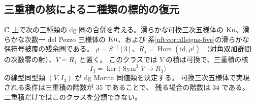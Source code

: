 \subsection{三重積の核による二種類の標的の復元}
\label{nft:sec:triple-kernel}
\begin{theorem}\label{nft:thm:triple-kernel}
$\mathbb C$ 上で次の三種類の dg 圏の合併を考える。滑らかな可換三次五様体の
$\operatorname{Ku}$、滑らかな次数一 del Pezzo 三様体の $\operatorname{Ku}$、および
系\ref{nft:cor:allsigns-five}の滑らかな偶符号被覆の残余圏である。
$\rho=S^{-1}[3]$、$R_j=\operatorname{Hom}(\mathrm{id},\rho^j)$
（対角双加群間の次数零の射）、$V=R_1$ と置く。
このクラスでは $V$ の積は可換で、三重積の核
\[
 I_3=\ker\big(\operatorname{Sym}^3V\longrightarrow R_3\big)
\]
の線型同型類 $(V,I_3)$ が dg Morita 同値類を決定する。
可換三次五様体で実現される条件は三重積の階数が $35$ であることで、
残る場合の階数は $34$ である。二重積だけではこのクラスを分類できない。
\end{theorem}
